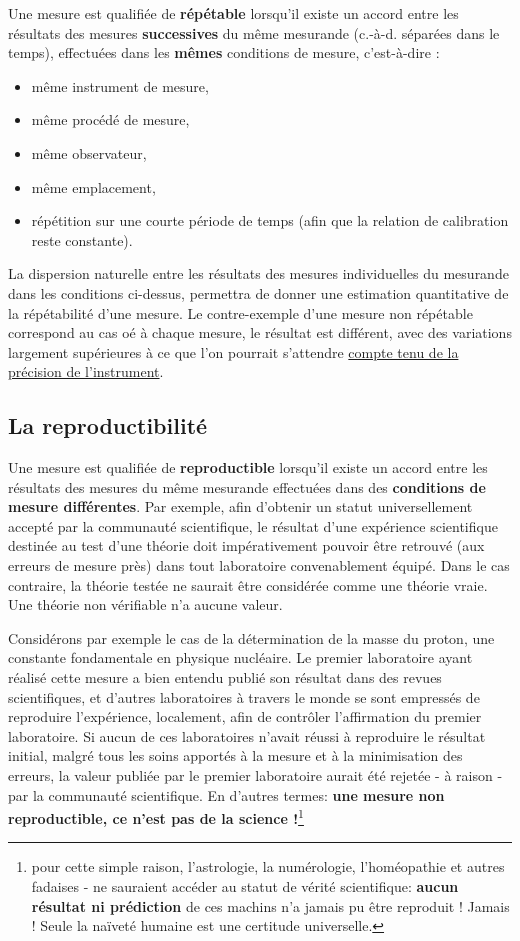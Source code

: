 Une mesure est qualifiée de \textbf{répétable} lorsqu'il existe un accord entre les résultats des mesures \textbf{successives} du même mesurande (c.-à-d. séparées dans le temps), effectuées dans les \textbf{mêmes} conditions de mesure, c'est-à-dire :
\begin{itemize}
    \item même instrument de mesure,
    \item même procédé de mesure,
    \item même observateur,
    \item même emplacement,
    \item répétition sur une courte période de temps (afin que la relation de calibration reste constante).
\end{itemize}
La dispersion naturelle entre les résultats des mesures individuelles du mesurande dans les conditions ci-dessus, permettra de donner une estimation quantitative de la répétabilité d'une mesure. Le contre-exemple d'une mesure non répétable correspond au cas oé à chaque mesure, le résultat est différent, avec des variations largement supérieures à ce que l'on pourrait s'attendre \underline{compte tenu de la précision de l'instrument}.

\subsection{La reproductibilité}

Une mesure est qualifiée de \textbf{reproductible} lorsqu'il existe un accord entre les résultats des mesures du même mesurande effectuées dans des \textbf{conditions de mesure différentes}. Par exemple, afin d'obtenir un statut universellement accepté par la communauté scientifique, le résultat d'une expérience scientifique destinée au test d'une théorie doit impérativement pouvoir être retrouvé (aux erreurs de mesure près) dans tout laboratoire convenablement équipé. Dans le cas contraire, la théorie testée ne saurait être considérée comme une théorie vraie. Une théorie non vérifiable n'a aucune valeur.

Considérons par exemple le cas de la détermination de la masse du proton, une constante fondamentale en physique nucléaire. Le premier laboratoire ayant réalisé cette mesure a bien entendu publié son résultat dans des revues scientifiques, et d'autres laboratoires à travers le monde se sont empressés de reproduire l'expérience, localement, afin de contrôler l'affirmation du premier laboratoire. Si aucun de ces laboratoires n'avait réussi à reproduire le résultat initial, malgré tous les soins apportés à la mesure et à la minimisation des erreurs, la valeur publiée par le premier laboratoire aurait été rejetée - à raison - par la communauté scientifique. En d'autres termes: \textbf{une mesure non reproductible, ce n'est pas de la science !}\footnote{pour cette simple raison, l'astrologie, la numérologie, l'homéopathie et autres fadaises - ne sauraient accéder au statut de vérité scientifique: \textbf{aucun résultat ni prédiction} de ces machins n'a jamais pu être reproduit ! Jamais ! Seule la naïveté humaine est une certitude universelle.}
